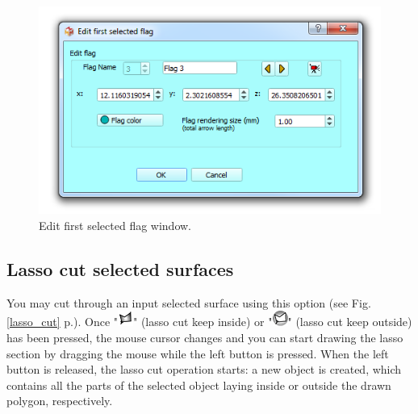 \begin{figure}
  \centering
  \includegraphics[scale=0.55]{images/06/objects/edit_flag.png} 
	\caption{Edit first selected flag window.}
\label{flag_edit}
 
\end{figure}
\subsection{Lasso cut selected surfaces} \label{lasso_cut_section}

You may cut through an input selected surface using this option (see Fig. \ref{lasso_cut} p.\pageref{lasso_cut}). Once "\includegraphics[scale=0.7]{images/06/objects/lasso_keepinside.png}" (lasso cut keep inside) or "\includegraphics[scale=0.7]{images/06/objects/lasso_keepoutside.png}" (lasso cut keep outside) has been pressed, the mouse cursor changes and you can start drawing the lasso section by dragging the mouse while the left button is pressed. When the left button is released, the lasso cut operation starts: a new object is created, which contains all the parts of the selected object laying inside or outside the drawn polygon, respectively.\\

